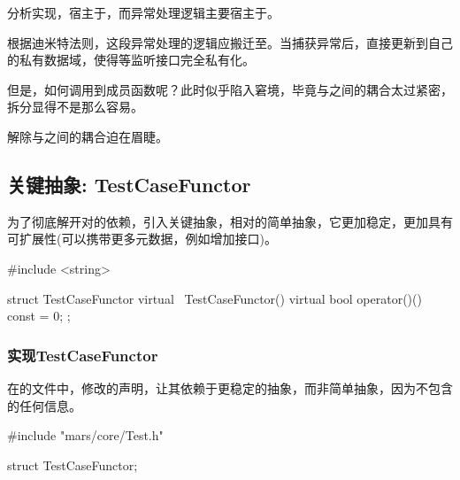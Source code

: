 \begin{content}

分析实现，宿主于，而异常处理逻辑主要宿主于。

根据迪米特法则，这段异常处理的逻辑应搬迁至。当捕获异常后，直接更新到自己的私有数据域，使得等监听接口完全私有化。

但是，如何调用到成员函数呢？此时似乎陷入窘境，毕竟与之间的耦合太过紧密，拆分显得不是那么容易。

解除与之间的耦合迫在眉睫。

\subsection{关键抽象: TestCaseFunctor}

为了彻底解开对的依赖，引入关键抽象，相对的简单抽象，它更加稳定，更加具有可扩展性(可以携带更多元数据，例如增加接口)。

\begin{leftbar}
 \begin{c++}[caption={\ttfamily{include/mars/core/internal/TestCaseFunctor.h}}]
#include <string>

struct TestCaseFunctor {
  virtual ~TestCaseFunctor() {}
  virtual bool operator()() const = 0;
};
 \end{c++}
\end{leftbar}

\subsubsection{实现TestCaseFunctor}

在的文件中，修改的声明，让其依赖于更稳定的抽象，而非简单抽象，因为不包含的任何信息。

\begin{leftbar}
 \begin{c++}[caption={\ttfamily{include/mars/core/TestCase.h}}]
#include "mars/core/Test.h"

struct TestCaseFunctor;


\end{c++}
\end{leftbar}
\end{content}

